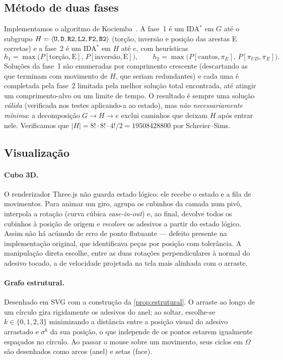 \subsection{Método de duas fases}
Implementamos o algoritmo de Kociemba~\cite{kociemba1992,kociembaweb}. A fase~1 é um IDA$^*$ em $G$ até o subgrupo $H=\langle\texttt{U},\texttt{D},\texttt{R2},\texttt{L2},\texttt{F2},\texttt{B2}\rangle$ (torção, inversão e posição das arestas E corretas) e a fase~2 é um IDA$^*$ em $H$ até $e$, com heurísticas
\begin{equation*}
h_1=\max\bigl(P[\text{torção},\text{E}],\,P[\text{inversão},\text{E}]\bigr),\qquad
h_2=\max\bigl(P[\text{cantos},\pi_E],\,P[\pi_{UD},\pi_E]\bigr).
\end{equation*} Soluções da fase~1 são enumeradas por comprimento crescente (descartando as que terminam com movimento de $H$, que seriam redundantes) e cada uma é completada pela fase~2 limitada pela melhor solução total encontrada, até atingir um comprimento-alvo ou um limite de tempo. O resultado é sempre uma solução \emph{válida} (verificada nos testes aplicando-a ao estado), mas \emph{não necessariamente mínima}: a decomposição $G\to H\to e$ exclui caminhos que deixam $H$ após entrar nele. Verificamos que $|H|=8!\cdot8!\cdot4!/2=\num{19508428800}$ por Schreier--Sims\ver.

\subsection{Visualização}
\paragraph{Cubo 3D.} O renderizador Three.js não guarda estado lógico: ele recebe o estado e a fila de movimentos. Para animar um giro, agrupa os cubinhos da camada num pivô, interpola a rotação (curva cúbica \textit{ease-in-out}) e, ao final, devolve todos os cubinhos à posição de origem e \emph{recolore} os adesivos a partir do estado lógico. Assim não há acúmulo de erro de ponto flutuante --- defeito presente na implementação original, que identificava peças por posição com tolerância. A manipulação direta escolhe, entre as duas rotações perpendiculares à normal do adesivo tocado, a de velocidade projetada na tela mais alinhada com o arraste.

\paragraph{Grafo estrutural.} Desenhado em SVG com a construção da \cref{prop:estrutural}. O arraste ao longo de um círculo gira rigidamente os adesivos do anel; ao soltar, escolhe-se $k\in\{0,1,2,3\}$ minimizando a distância entre a posição visual do adesivo arrastado e $\sigma^k$ da sua posição, o que independe de os pontos estarem igualmente espaçados no círculo. Ao passar o mouse sobre um movimento, seus ciclos em $\Omega$ são desenhados como arcos (anel) e setas (face).

